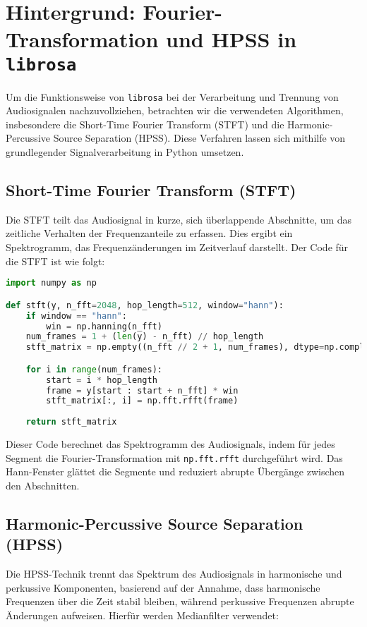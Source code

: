 \section{Hintergrund: Fourier-Transformation und HPSS in \texttt{librosa}}

Um die Funktionsweise von \texttt{librosa} bei der Verarbeitung und Trennung von Audiosignalen nachzuvollziehen, betrachten wir die verwendeten Algorithmen, insbesondere die Short-Time Fourier Transform (STFT) und die Harmonic-Percussive Source Separation (HPSS). Diese Verfahren lassen sich mithilfe von grundlegender Signalverarbeitung in Python umsetzen.

\subsection{Short-Time Fourier Transform (STFT)}
\label{stft_code}

Die STFT teilt das Audiosignal in kurze, sich überlappende Abschnitte, um das zeitliche Verhalten der Frequenzanteile zu erfassen. Dies ergibt ein Spektrogramm, das Frequenzänderungen im Zeitverlauf darstellt. Der Code für die STFT ist wie folgt:

\begin{lstlisting}[language=Python, caption={STFT-Implementierung}]
import numpy as np

def stft(y, n_fft=2048, hop_length=512, window="hann"):
    if window == "hann":
        win = np.hanning(n_fft)
    num_frames = 1 + (len(y) - n_fft) // hop_length
    stft_matrix = np.empty((n_fft // 2 + 1, num_frames), dtype=np.complex64)

    for i in range(num_frames):
        start = i * hop_length
        frame = y[start : start + n_fft] * win
        stft_matrix[:, i] = np.fft.rfft(frame)
    
    return stft_matrix
\end{lstlisting}

Dieser Code berechnet das Spektrogramm des Audiosignals, indem für jedes Segment die Fourier-Transformation mit \texttt{np.fft.rfft} durchgeführt wird. Das Hann-Fenster glättet die Segmente und reduziert abrupte Übergänge zwischen den Abschnitten.

\subsection{Harmonic-Percussive Source Separation (HPSS)}

Die HPSS-Technik trennt das Spektrum des Audiosignals in harmonische und perkussive Komponenten, basierend auf der Annahme, dass harmonische Frequenzen über die Zeit stabil bleiben, während perkussive Frequenzen abrupte Änderungen aufweisen. Hierfür werden Medianfilter verwendet:

